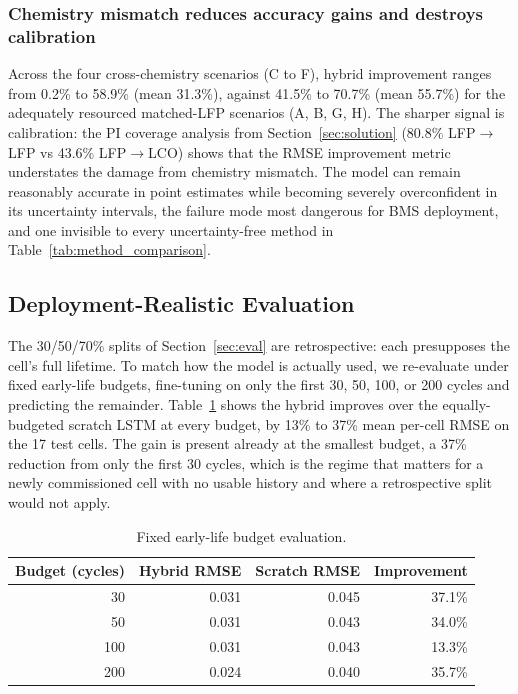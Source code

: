 \subsubsection{Chemistry mismatch reduces accuracy gains and destroys
calibration}
Across the four cross-chemistry scenarios (C to F), hybrid improvement ranges
from 0.2\% to 58.9\% (mean 31.3\%), against 41.5\% to 70.7\% (mean
55.7\%) for the adequately resourced matched-LFP scenarios (A, B, G, H).
The sharper signal is calibration: the PI coverage analysis from
Section~\ref{sec:solution} (80.8\% LFP$\rightarrow$LFP vs 43.6\%
LFP$\rightarrow$LCO) shows that the RMSE improvement metric understates the
damage from chemistry mismatch.
The model can remain reasonably accurate in point estimates while becoming
severely overconfident in its uncertainty intervals, the failure mode most
dangerous for BMS deployment, and one invisible to every uncertainty-free
method in Table~\ref{tab:method_comparison}.

\subsection{Deployment-Realistic Evaluation}\label{sec:deployment}

The 30/50/70\% splits of Section~\ref{sec:eval} are retrospective: each presupposes
the cell's full lifetime. To match how the model is actually used, we re-evaluate
under fixed early-life budgets, fine-tuning on only the first 30, 50, 100, or 200
cycles and predicting the remainder. Table~\ref{tab:budget} shows the hybrid improves
over the equally-budgeted scratch LSTM at every budget, by 13\% to 37\% mean per-cell
RMSE on the 17 test cells. The gain is present already at the smallest budget, a 37\%
reduction from only the first 30 cycles, which is the regime that matters for a newly
commissioned cell with no usable history and where a retrospective split would not
apply.

\begin{table}[pos=htbp]
\centering
\caption{Fixed early-life budget evaluation.}\label{tab:budget}
\footnotesize
\begin{tabular*}{\columnwidth}{@{\extracolsep{\fill}}rrrr}
\toprule
Budget (cycles) & Hybrid RMSE & Scratch RMSE & Improvement \\
\midrule
30  & 0.031 & 0.045 & 37.1\% \\
50  & 0.031 & 0.043 & 34.0\% \\
100 & 0.031 & 0.043 & 13.3\% \\
200 & 0.024 & 0.040 & 35.7\% \\
\bottomrule
\end{tabular*}
\end{table}

